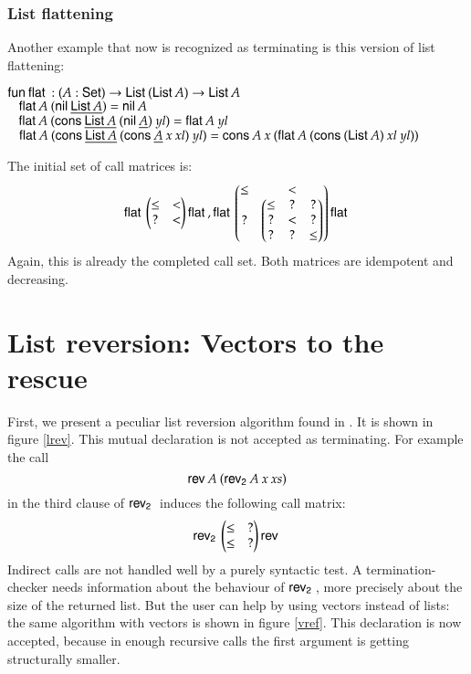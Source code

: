 \subsubsection{List flattening}
Another example that now is recognized as terminating is this version of list flattening:
\begin{bsp}
$\mathsf{fun}\: \mathsf{flat}\: : (A : \mathsf{Set} ) \rightarrow \mathsf{List}\: (\mathsf{List}\: A) \rightarrow \mathsf{List}\: A$\\
$\hspace*{3mm} \mathsf{flat}\: A \: (\mathsf{nil}\: \underline{\mathsf{List}\: A}) = \mathsf{nil}\: A $\\
$\hspace*{3mm} \mathsf{flat}\: A \: (\mathsf{cons}\: \underline{\mathsf{List}\: A} \: (\mathsf{nil}\: \underline{A}) \: yl) = \mathsf{flat}\: A \: yl $\\
$\hspace*{3mm} \mathsf{flat}\: A \: (\mathsf{cons}\: \underline{\mathsf{List}\: A} \: (\mathsf{cons}\: \underline{A} \: x \: xl) \: yl)  = \mathsf{cons}\: A \: x \: (\mathsf{flat}\: A \: (\mathsf{cons}\: (\mathsf{List}\: A) \: xl \: yl))$
\end{bsp}
\noindent The initial set of call matrices is:
\[
\mathsf{flat}\: \begin{pmatrix}
\leq & < \\
?    & < 
\end{pmatrix}\mathsf{flat}\:
, 
\mathsf{flat}\: \begin{pmatrix}
\leq & < \\
?    & 
\begin{pmatrix}
\leq &  ?  & ? \\
?    &  <  & ? \\
?    &  ?  & \leq 
\end{pmatrix}
\end{pmatrix}\mathsf{flat}\:
\] 
Again, this is already the completed call set.
Both matrices are idempotent and decreasing.

\section{List reversion: Vectors to the rescue}
First, we present a peculiar list reversion algorithm found in \cite{blanqui04typebased}.
It is shown in figure \ref{lrev}. This mutual declaration is not accepted as terminating. 
For example the call 
\[\mathsf{rev}\: A \: (\mathsf{rev_2}\: A \: x \: xs)\]
in the third clause of $\mathsf{rev_2}\:$ induces the following call matrix:
\[
\mathsf{rev_2}\: \begin{pmatrix}
\leq & ? \\
\leq & ?  
\end{pmatrix}\mathsf{rev}\:
\] 
Indirect calls are not handled well by a purely syntactic test.
A termination-checker needs information about the behaviour of $\mathsf{rev_2}\:$, more precisely 
about the size of the returned list.
But the user can help by using vectors instead of lists: the same algorithm with vectors is shown in figure \ref{vref}. 
This declaration is now accepted, because in enough recursive calls the first argument is getting structurally smaller.

